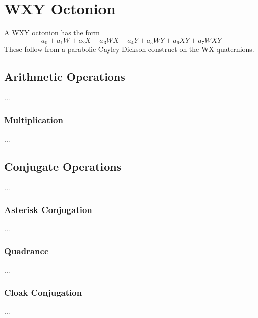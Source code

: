 \chapter{WXY Octonion}
A WXY octonion has the form
\begin{equation}
    a_{0} + a_{1} W + a_{2} X + a_{3} WX + a_{4} Y + a_{5} WY + a_{6} XY + a_{7} WXY
\end{equation}
These follow from a parabolic Cayley-Dickson construct on the WX quaternions.
\section{Arithmetic Operations}
...
\subsection{Multiplication}
...
\section{Conjugate Operations}
...
\subsection{Asterisk Conjugation}
...
\subsection{Quadrance}
...
\subsection{Cloak Conjugation}
...
